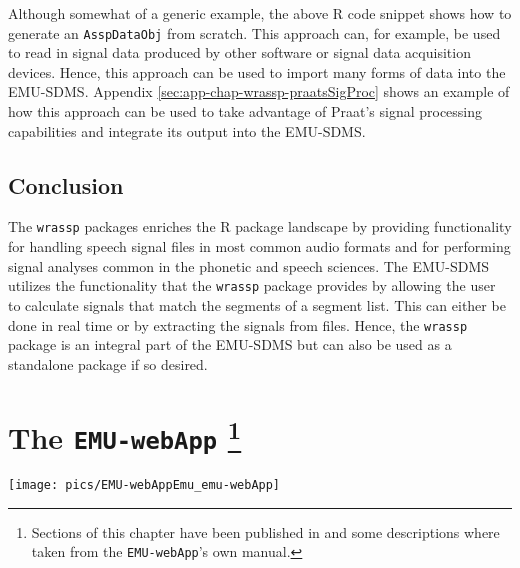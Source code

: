 \documentclass[
]{book}
\begin{document}
Although somewhat of a generic example, the above R code snippet shows how to generate an \texttt{AsspDataObj} from scratch. This approach can, for example, be used to read in signal data produced by other software or signal data acquisition devices. Hence, this approach can be used to import many forms of data into the EMU-SDMS. Appendix \ref{sec:app-chap-wrassp-praatsSigProc} shows an example of how this approach can be used to take advantage of Praat's signal processing capabilities and integrate its output into the EMU-SDMS.

\hypertarget{conclusion-4}{%
\section{Conclusion}\label{conclusion-4}}

The \texttt{wrassp} packages enriches the R package landscape by providing functionality for handling speech signal files in most common audio formats and for performing signal analyses common in the phonetic and speech sciences. The EMU-SDMS utilizes the functionality that the \texttt{wrassp} package provides by allowing the user to calculate signals that match the segments of a segment list. This can either be done in real time or by extracting the signals from files. Hence, the \texttt{wrassp} package is an integral part of the EMU-SDMS but can also be used as a standalone package if so desired.

\hypertarget{chap:emu-webApp}{%
\chapter[The \texttt{EMU-webApp} ]{\texorpdfstring{The \texttt{EMU-webApp} \footnote{Sections of this chapter have been published in \citep{winkelmann:2015d} and some descriptions where taken from the \texttt{EMU-webApp}'s own manual.}}{The EMU-webApp }}\label{chap:emu-webApp}}

\begin{center}\texttt{[image: pics/EMU-webAppEmu\_emu-webApp]} \end{center}
\end{document}
